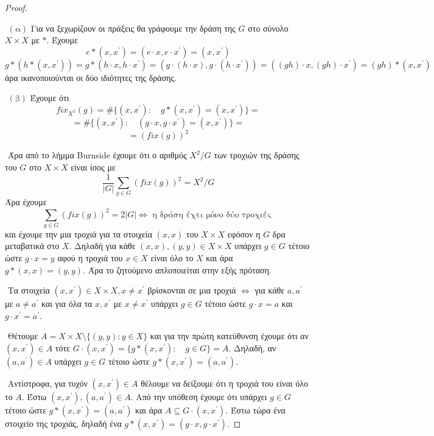 \documentclass[oneside,a4paper]{article}
\newcommand {\tl}{\textlatin}
\begin{document}
\vspace*{1cm}
\begin{proof} $ $

	$ $\newline
	$(\text{α})$ Για να ξεχωρίζουν οι πράξεις θα γράφουμε την δράση της $G$ στο σύνολο $X \times X$ με $*$. Έχουμε $$e*(x,x^{\prime}) = (e \cdot x, e \cdot x^{\prime} ) = (x, x^{\prime})$$ $$g*(h * (x,x^{\prime})) = g*(h\cdot x, h \cdot x^{\prime}) = (g\cdot (h\cdot x),g \cdot (h \cdot x^{\prime})) = ((gh)\cdot x , (gh)\cdot x^{\prime}) = (gh) * (x,x^{\prime})$$ άρα ικανοποιούνται οι δύο ιδιότητες της δράσης.
	
	\vspace*{0.1cm}
	$ $\newline
	$(\text{β})$ Έχουμε ότι $$fix_{X^2}(g) = \# \{(x,x^{\prime}): \quad g*(x,x^{\prime}) = (x,x^{\prime})\} = $$
	$$ = \#\{(x,x^{\prime}): \quad (g\cdot x,g\cdot x^{\prime}) = (x,x^{\prime})\} = $$
	$$=(fix (g))^2$$

	$ $\newline
	Άρα από το λήμμα \tl{Burnside} έχουμε ότι ο αριθμός $X^2/G$ των τροχιών της δράσης του $G$ στο $X\times X$ είναι ίσος με $$\frac{1}{|G|}\sum\limits_{g \in G} (fix(g))^2 = X^2/G$$ Άρα έχουμε $$\sum\limits_{g \in G} (fix(g))^2 = 2|G| \iff \text{ η δράση έχει μόνο δύο τροχιές }$$ και έχουμε την μια τροχιά για τα στοιχεία $(x,x)$ του $X\times X$ εφόσον η $G$ δρα μεταβατικά στο $X$. Δηλαδή για κάθε $(x,x),(y,y) \in X\times X$ υπάρχει $g \in G$ τέτοιο ώστε $g\cdot x = y$ αφού η τροχιά του $x \in X$ είναι όλο το $X$ και άρα $g*(x,x) = (y,y)$. Άρα το ζητούμενο απλοποιείται στην εξής πρόταση.
	
	$ $\newline
	Τα στοιχεία $(x,x^{\prime}) \in X\times X, x\neq x^{\prime}$ βρίσκονται σε μια τροχιά $\iff$ για κάθε $a,a^{\prime}$ με $a\neq a^{\prime}$ και για όλα τα $x,x^{\prime}$ με $x \neq x^{\prime}$ υπάρχει $g \in G$ τέτοιο ώστε $g \cdot x = a$ και $g \cdot x^{\prime} = a^{\prime}$.

	$ $\newline
	Θέτουμε $A = X\times X\setminus \{(y,y): y \in X\}$ και για την πρώτη κατεύθυνση έχουμε ότι αν $(x,x^{\prime}) \in A$ τότε $G\cdot (x,x^{\prime}) = \{g*(x,x^{\prime}): \quad g \in G\} = A$. Δηλαδή, αν $(a,a^{\prime}) \in A$ υπάρχει $g \in G$ τέτοιο ώστε $g*(x,x^\prime) = (a,a^{\prime})$.

	$ $\newline
	Αντίστροφα, για τυχόν $(x,x^{\prime}) \in A$ θέλουμε να δείξουμε ότι η τροχιά του είναι όλο το $A$. Έστω $(x,x^{\prime}),(a,a^{\prime}) \in A$. Από την υπόθεση έχουμε ότι υπάρχει $g \in G$ τέτοιο ώστε $g *(x,x^{\prime}) = (a,a^\prime)$ και άρα $A \subseteq G \cdot (x,x^{\prime})$. Έστω τώρα ένα στοιχείο της τροχιάς, δηλαδή ένα $g*(x,x^{\prime}) = (g\cdot x, g \cdot x^{\prime})$. 
	

\end{proof}
\end{document}
